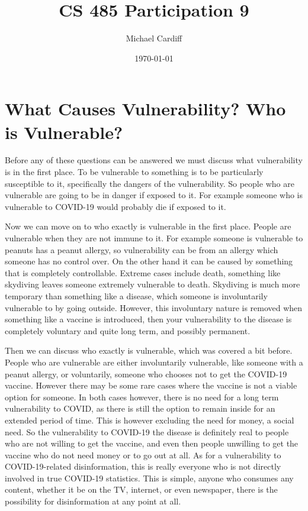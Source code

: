 \documentclass[12pt]{article}
\title{\vspace{-3em}CS 485 Participation 9}
\author{Michael Cardiff}
\date{\today}
\begin{document}
\maketitle

\section{What Causes Vulnerability? Who is Vulnerable?}
Before any of these questions can be answered we must discuss what vulnerability is in the first place. To be vulnerable to something is to be particularly susceptible to it, specifically the dangers of the vulnerability. So people who are vulnerable are going to be in danger if exposed to it. For example someone who is vulnerable to COVID-19 would probably die if exposed to it.

Now we can move on to who exactly is vulnerable in the first place. People are vulnerable when they are not immune to it. For example someone is vulnerable to peanuts has a peanut allergy, so vulnerability can be from an allergy which someone has no control over. On the other hand it can be caused by something that is completely controllable. Extreme cases include death, something like skydiving leaves someone extremely vulnerable to death. Skydiving is much more temporary than something like a disease, which someone is involuntarily vulnerable to by going outside. However, this involuntary nature is removed when something like a vaccine is introduced, then your vulnerability to the disease is completely voluntary and quite long term, and possibly permanent.

Then we can discuss who exactly is vulnerable, which was covered a bit before. People who are vulnerable are either involuntarily vulnerable, like someone with a peanut allergy, or voluntarily, someone who chooses not to get the COVID-19 vaccine. However there may be some rare cases where the vaccine is not a viable option for someone. In both cases however, there is no need for a long term vulnerability to COVID, as there is still the option to remain inside for an extended period of time. This is however excluding the need for money, a social need. So the vulnerability to COVID-19 the disease is definitely real to people who are not willing to get the vaccine, and even then people unwilling to get the vaccine who do not need money or to go out at all. As for a vulnerability to COVID-19-related disinformation, this is really everyone who is not directly involved in true COVID-19 statistics. This is simple, anyone who consumes any content, whether it be on the TV, internet, or even newspaper, there is the possibility for disinformation at any point at all. \newpage
\end{document}
